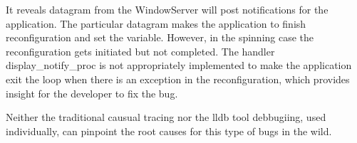 It reveals datagram from the WindowServer will post notifications for the application.                                   
The particular datagram makes the application to finish reconfiguration and set the variable.
However, in the spinning case the reconfiguration gets initiated but not completed.
The handler display\_notify\_proc is not appropriately implemented to make the application exit the loop when there is an exception in the reconfiguration,
which provides insight for the developer to fix the bug.

Neither the traditional causual tracing nor the lldb tool debbugiing, used individually, can pinpoint the root causes for this type of bugs in the wild.
